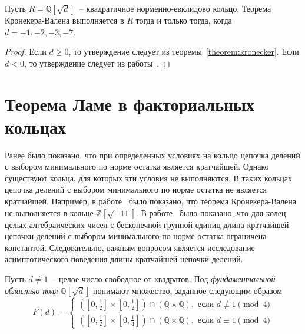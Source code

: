 \documentclass[_00_dissertation.tex]{subfiles}
\begin{document}
\begin{proposition}
    Пусть $R = \mathbb{Q}[\sqrt{d}]$~-- квадратичное норменно-евклидово кольцо.
    Теорема Кронекера-Валена выполняется в $R$ тогда и только тогда, когда $d=-1, -2, -3, -7$.
\end{proposition}
\begin{proof}
    Если $d \ge 0$, то утверждение следует из теоремы~\ref{theorem:kronecker}.
    Если $d < 0$, то утверждение следует из работы~\cite{source:Rolletschek_1990}.
\end{proof}

\section{Теорема Ламе в факториальных кольцах}

Ранее было показано, что при определенных условиях на кольцо цепочка делений с выбором минимального по норме остатка является кратчайшей.
Однако существуют кольца, для которых эти условия не выполняются.
В таких кольцах цепочка делений с выбором минимального по норме остатка не является кратчайшей.
Например, в работе~\cite{source:Rolletschek_1990} было показано, что теорема Кронекера-Валена не выполняется в кольце $\mathbb{Z}[\sqrt{-11}]$.
В работе~\cite{source:Cooke} было показано, что для колец целых алгебраических чисел с бесконечной группой единиц длина кратчайшей цепочки делений с выбором минимального по норме остатка ограничена константой.
Следовательно, важным вопросом является исследование асимптотического поведения длины кратчайшей цепочки делений.

\begin{definition}
    Пусть $d \neq 1$~-- целое число свободное от квадратов.
    Под \emph{фундаментальной областью поля} $\mathbb{Q}[\sqrt{d}]$ понимают множество, заданное следующим образом
    \begin{equation*}
        F(d) = \begin{cases}
            \left(
                \left[0, \frac{1}{2}\right] \times \left[0, \frac{1}{2}\right]
            \right) \cap \left(
                \mathbb{Q} \times \mathbb{Q}
            \right), \textrm{ если } d \not\equiv 1 \pmod 4\\
            \left(
                \left[0, \frac{1}{2}\right] \times \left[0, \frac{1}{4}\right]
            \right) \cap \left(
                \mathbb{Q} \times \mathbb{Q}
            \right), \textrm{ если } d \equiv 1 \pmod 4
        \end{cases}
    \end{equation*}
\end{definition}
\end{document}
